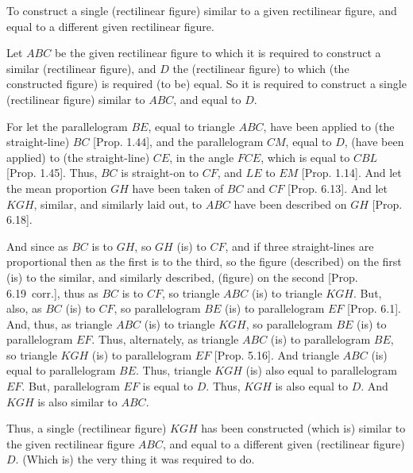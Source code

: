 \begin{Parallel}{}{}
{To
 construct a single (rectilinear figure) similar to a given rectilinear figure, and equal to
a different given rectilinear figure.

\epsfysize=1.35in
\centerline{}

Let $ABC$ be the given rectilinear figure to which it is required to construct
a similar (rectilinear figure), and $D$ the (rectilinear figure) to which (the constructed figure) is required (to be) equal. So it is required to
construct a single (rectilinear figure) similar to $ABC$, and equal to $D$.

For  let the parallelogram $BE$, equal to triangle $ABC$, have been applied to
(the straight-line) $BC$  [Prop. 1.44], and the parallelogram $CM$, equal to $D$, (have been applied) to (the straight-line) $CE$,  in the angle $FCE$, which is equal to $CBL$  [Prop. 1.45]. Thus, $BC$ is
straight-on to $CF$, and $LE$ to $EM$ [Prop. 1.14]. And let the mean proportion $GH$ have
been taken of $BC$ and $CF$  [Prop. 6.13].
And let $KGH$, similar, and similarly laid out, to  $ABC$ have been described
on $GH$ [Prop. 6.18].

And since as $BC$ is to $GH$, so $GH$ (is) to $CF$, and if three straight-lines are
proportional then as the first is to the third, so the figure (described) on the first
(is) to the similar, and similarly described, (figure) on the second 
[Prop. 6.19~corr.],  thus as $BC$ is to
$CF$, so triangle $ABC$ (is) to triangle $KGH$. But, also, as $BC$ (is) to
$CF$, so parallelogram $BE$ (is) to parallelogram $EF$ [Prop. 6.1]. And, thus,  as triangle $ABC$ (is) to triangle $KGH$, so parallelogram $BE$ (is) to parallelogram $EF$. 
Thus, alternately, as triangle
$ABC$ (is) to parallelogram $BE$, so triangle $KGH$ (is) to
parallelogram $EF$ [Prop. 5.16]. 
And triangle $ABC$ (is) equal to parallelogram $BE$. Thus, triangle $KGH$
(is) also equal to parallelogram $EF$. But, parallelogram $EF$ is equal to $D$. 
Thus, $KGH$ is also equal to $D$. And $KGH$ is also similar to $ABC$.

Thus, a single (rectilinear figure) $KGH$ has been constructed (which is)
similar to the given rectilinear figure $ABC$, and equal to a different
given (rectilinear figure) $D$. (Which is) the very thing it was required to do.}
\end{Parallel}

